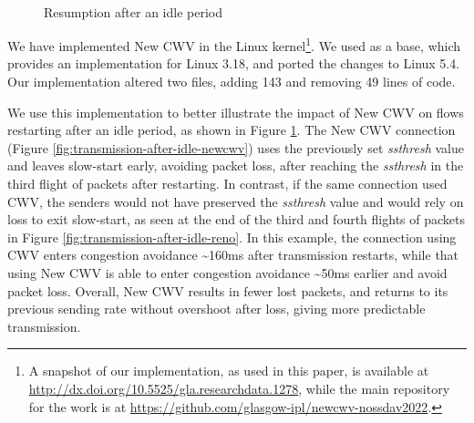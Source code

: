 \documentclass[10pt,sigconf]{acmart}
\begin{document}
\begin{figure}[t!]
  \centering
  \\
  \caption{Resumption after an idle period}
  \label{fig:transmission-after-idle}
\end{figure}

We have implemented New CWV in the Linux kernel\footnote{A snapshot of our implementation, as used in this paper, is available at \url{http://dx.doi.org/10.5525/gla.researchdata.1278}, while the main repository for the work is at \url{https://github.com/glasgow-ipl/newcwv-nossdav2022}.}. We used \cite{secchi-2016-newcwv} as a base, which provides an implementation for Linux 3.18, and ported the changes to Linux 5.4. Our implementation altered two files, adding 143 and removing 49 lines of code.

We use this implementation to better illustrate the impact of New CWV on flows restarting after an idle period, as shown in Figure \ref{fig:transmission-after-idle}.
The New CWV connection (Figure \ref{fig:transmission-after-idle-newcwv}) uses the previously set \emph{ssthresh} value and leaves slow-start early, avoiding packet loss, after reaching the \emph{ssthresh} in the third flight of packets after restarting. 
In contrast, if the same connection used CWV, the senders would not have preserved the \emph{ssthresh} value and would rely on loss to exit slow-start, as seen at the end of the third and fourth flights of packets in Figure \ref{fig:transmission-after-idle-reno}. In this example, the connection using CWV enters congestion avoidance \textasciitilde160ms after transmission restarts, while that using New CWV is able to enter congestion avoidance \textasciitilde50ms earlier and avoid packet loss.
Overall, New CWV results in fewer lost packets, and returns to its previous sending rate without overshoot after loss, giving more predictable transmission.
\end{document}

